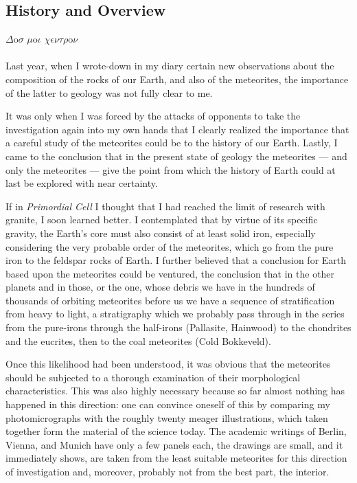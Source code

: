 \documentclass[a4paper, 12pt, oneside]{article}
\begin{document}
\subsection{History and Overview}
$\Delta$o$\sigma$ $\mu$o$\iota$ $\chi\epsilon\nu\tau\rho$o$\nu$%
\paragraph{}
Last year, when I wrote-down in my diary certain new observations about the composition of the rocks of our Earth, and also of the meteorites, the importance of the latter to geology was not fully clear to me.

It was only when I was forced by the attacks of opponents to take the investigation again into my own hands that I clearly realized the importance that a careful study of the meteorites could be to the history of our Earth. Lastly, I came to the conclusion that in the present state of geology the meteorites — and only the meteorites — give the point from which the history of Earth could at last be explored with near certainty.

If in \emph{Primordial Cell} I thought that I had reached the limit of research with granite, I soon learned better. I contemplated that by virtue of its specific gravity, the Earth's core must also consist of at least solid iron, especially considering the very probable order of the meteorites, which go from the pure iron to the feldspar rocks of Earth. I further believed that a conclusion for Earth based upon the meteorites could be ventured, the conclusion that in the other planets and in those, or the one, whose debris we have in the hundreds of thousands of orbiting meteorites before us we have a sequence of stratification from heavy to light, a stratigraphy which we probably pass through in the series from the pure-irons through the half-irons (Pallasite, Hainwood) to the chondrites and the eucrites, then to the coal meteorites (Cold Bokkeveld).

Once this likelihood had been understood, it was obvious that the meteorites should be subjected to a thorough examination of their morphological characteristics. This was also highly necessary because so far almost nothing has happened in this direction: one can convince oneself of this by comparing my photomicrographs with the roughly twenty meager illustrations, which taken together form the material of the science today. The academic writings of Berlin, Vienna, and Munich have only a few panels each, the drawings are small, and it immediately shows, are taken from the least suitable meteorites for this direction of investigation and, moreover, probably not from the best part, the interior.
\end{document}
